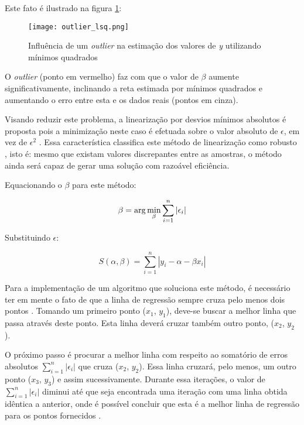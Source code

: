 Este fato é ilustrado na figura \ref{fig:infl_outlier}:

\begin{figure}[htp]
    \centering
    \texttt{[image: outlier\_lsq.png]}
    \caption{Influência de um \textit{outlier} na estimação dos valores de \textit{y} utilizando mínimos quadrados}
    \label{fig:infl_outlier}
\end{figure}

O \textit{outlier} (ponto em vermelho) faz com que o valor de $\beta$ aumente significativamente, inclinando a reta estimada por mínimos quadrados e aumentando o erro entre esta e os dados reais (pontos em cinza).

Visando reduzir este problema, a linearização por desvios mínimos absolutos é proposta pois a minimização neste caso é efetuada sobre o valor absoluto de $\epsilon$, em vez de $\epsilon^2$ \cite{lad}. Essa característica classifica este método de linearização como robusto \cite{robust}, isto é: mesmo que existam valores discrepantes entre as amostras, o método ainda será capaz de gerar uma solução com razoável eficiência.

Equacionando o $\beta$ para este método:

\begin{equation}\label{eq:17}
 \beta =\arg\min_{\beta}\sum_{i=1}^{n}|\epsilon_{i}|\\ 
\end{equation}

Substituindo $\epsilon$:

\begin{equation}\label{eq:18}
S(\alpha, \beta) = \sum_{i=1}^{n} |y_i - \alpha - \beta x_i|
\end{equation}

Para a implementação de um algoritmo que soluciona este método, é necessário ter em mente o fato de que a linha de regressão sempre cruza pelo menos dois pontos \cite{lad}. Tomando um primeiro ponto ($x_1$, $y_1$), deve-se buscar a melhor linha que passa através deste ponto. Esta linha deverá cruzar também outro ponto, ($x_2$, $y_2$). 

O próximo passo é procurar a melhor linha com respeito ao somatório de erros absolutos $\sum_{i=1}^{n}|\epsilon_{i}|$ que cruza ($x_2$, $y_2$). Essa linha cruzará, pelo menos, um outro ponto ($x_3$, $y_3$) e assim sucessivamente. Durante essa iterações, o valor de $\sum_{i=1}^{n}|\epsilon_{i}|$ diminui até que seja encontrada uma iteração com uma linha obtida idêntica a anterior, onde é possível concluir que esta é a melhor linha de regressão para os pontos fornecidos \cite{conciseenclyclopediaofstatistics}.

